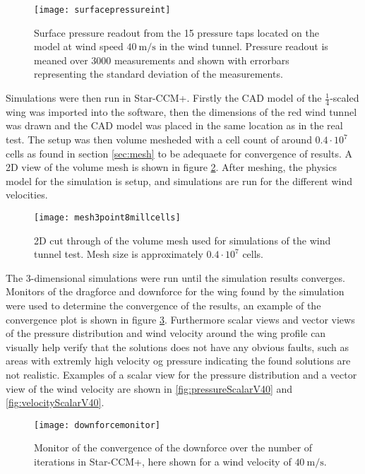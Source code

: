   \begin{figure}
    \texttt{[image: surfacepressureint]}
    \caption{Surface pressure readout from the 15 pressure taps located on the model at wind speed $\SI{40}{\metre\per\second}$ in the wind tunnel. Pressure readout is meaned over 3000 measurements and shown with errorbars representing the standard deviation of the measurements.}
    \label{fig:surfacepressureint}
  \end{figure}

  Simulations were then run in Star-CCM+. Firstly the CAD model of the $\frac{1}{4}$-scaled wing was imported into the software, then the dimensions of the red wind tunnel was drawn and the CAD model was placed in the same location as in the real test. The setup was then volume mesheded with a cell count of around $0.4 \cdot 10^{7}$ cells as found in section \ref{sec:mesh} to be adequaete for convergence of results. A 2D view of the volume mesh is shown in figure \ref{fig:mesh3point8mill}. After meshing, the physics model for the simulation is setup, and simulations are run for the different wind velocities.

  \begin{figure}
    \texttt{[image: mesh3point8millcells]}
    \caption{2D cut through of the volume mesh used for simulations of the wind tunnel test. Mesh size is approximately $0.4 \cdot 10^{7}$ cells.}
    \label{fig:mesh3point8mill}
  \end{figure}

  The 3-dimensional simulations were run until the simulation results converges. Monitors of the dragforce and downforce for the wing found by the simulation were used to determine the convergence of the results, an example of the convergence plot is shown in figure \ref{fig:downforcemonitor}. Furthermore scalar views and vector views of the pressure distribution and wind velocity around the wing profile can visually help verify that the solutions does not have any obvious faults, such as areas with extremly high velocity og pressure indicating the found solutions are not realistic. Examples of a scalar view for the pressure distribution and a vector view of the wind velocity are shown in \ref{fig:pressureScalarV40} and \ref{fig:velocityScalarV40}.

  \begin{figure}
    \texttt{[image: downforcemonitor]}
    \caption{Monitor of the convergence of the downforce over the number of iterations in Star-CCM+, here shown for a wind velocity of $\SI{40}{\metre\per\second}$.}
    \label{fig:downforcemonitor}
  \end{figure}


